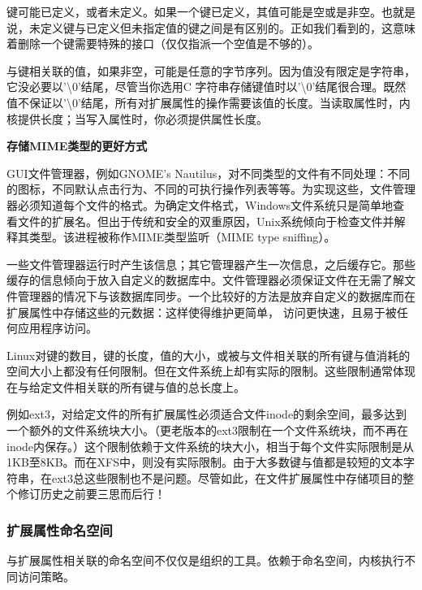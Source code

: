 键可能已定义，或者未定义。如果一个键已定义，其值可能是空或是非空。也就是说，未定义键与已定义但未指定值的键之间是有区别的。正如我们看到的，这意味着删除一个键需要特殊的接口（仅仅指派一个空值是不够的）。

与键相关联的值，如果非空，可能是任意的字节序列。因为值没有限定是字符串，它没必要以'\textbackslash0'结尾，尽管当你选用C 字符串存储键值时以'\textbackslash0'结尾很合理。既然值不保证以'\textbackslash0'结尾，所有对扩展属性的操作需要该值的长度。当读取属性时，内核提供长度；当写入属性时，你必须提供属性长度。

\begin{center}
\begin{boxedminipage}{\textwidth}
\begin{center}\textbf{存储MIME类型的更好方式}\end{center}
GUI文件管理器，例如GNOME's Nautilus，对不同类型的文件有不同处理：不同的图标，不同默认点击行为、不同的可执行操作列表等等。为实现这些，文件管理器必须知道每个文件的格式。为确定文件格式，Windows文件系统只是简单地查看文件的扩展名。但出于传统和安全的双重原因，Unix系统倾向于检查文件并解释其类型。该进程被称作MIME类型监听（MIME type sniffing）。

一些文件管理器运行时产生该信息；其它管理器产生一次信息，之后缓存它。那些缓存的信息倾向于放入自定义的数据库中。文件管理器必须保证文件在无需了解文件管理器的情况下与该数据库同步。一个比较好的方法是放弃自定义的数据库而在扩展属性中存储这些的元数据：这样使得维护更简单， 访问更快速，且易于被任何应用程序访问。
\end{boxedminipage}
\end{center}

Linux对键的数目，键的长度，值的大小，或被与文件相关联的所有键与值消耗的空间大小上都没有任何限制。但在文件系统上却有实际的限制。这些限制通常体现在与给定文件相关联的所有键与值的总长度上。

例如ext3，对给定文件的所有扩展属性必须适合文件inode的剩余空间，最多达到一个额外的文件系统块大小。（更老版本的ext3限制在一个文件系统块，而不再在inode内保存。）这个限制依赖于文件系统的块大小，相当于每个文件实际限制是从1KB至8KB。而在XFS中，则没有实际限制。由于大多数键与值都是较短的文本字符串，在ext3总这些限制也不是问题。尽管如此，在文件扩展属性中存储项目的整个修订历史之前要三思而后行！ 

\subsubsection{扩展属性命名空间}

与扩展属性相关联的命名空间不仅仅是组织的工具。依赖于命名空间，内核执行不同访问策略。

